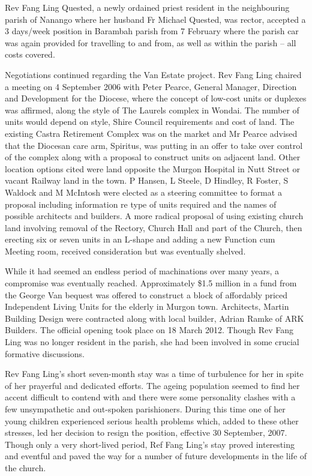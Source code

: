 Rev Fang Ling Quested, a newly ordained priest resident in the neighbouring parish of Nanango where her husband Fr Michael Quested, was rector, accepted a 3 days/week position in Barambah parish from 7 February where the parish car was again provided for travelling to and from, as well as within the parish -- all costs covered.



Negotiations continued regarding the Van Estate project. Rev Fang Ling chaired a meeting on 4 September 2006 with Peter Pearce, General Manager, Direction and Development for the Diocese, where the concept of low-cost units or duplexes was affirmed, along the style of The Laurels complex in Wondai. The number of units would depend on style, Shire Council requirements and cost of land. The existing Castra Retirement Complex was on the market and Mr Pearce advised that the Diocesan care arm, Spiritus, was putting in an offer to take over control of the complex along with a proposal to construct units on adjacent land. Other location options cited were land opposite the Murgon Hospital in Nutt Street or vacant Railway land in the town. P Hansen, L Steele, D Hindley, R Foster, S Waldock and M McIntosh were elected as a steering committee to format a proposal including information re type of units required and the names of possible architects and builders. A more radical proposal of using existing church land involving removal of the Rectory, Church Hall and part of the Church, then erecting six or seven units in an L-shape and adding a new Function cum Meeting room, received consideration but was eventually shelved.



While it had seemed an endless period of machinations over many years, a compromise was eventually reached. Approximately \$1.5 million in a fund from the George Van bequest was offered to construct a block of affordably priced Independent Living Units for the elderly in Murgon town. Architects, Martin Building Design were contracted along with local builder, Adrian Ramke of ARK Builders. The official opening took place on 18 March 2012. Though Rev Fang Ling was no longer resident in the parish, she had been involved in some crucial formative discussions.



Rev Fang Ling's short seven-month stay was a time of turbulence for her in spite of her prayerful and dedicated efforts. The ageing population seemed to find her accent difficult to contend with and there were some personality clashes with a few unsympathetic and out-spoken parishioners. During this time one of her young children experienced serious health problems which, added to these other stresses, led her decision to resign the position, effective 30 September, 2007. Though only a very short-lived period, Ref Fang Ling's stay proved interesting and eventful and paved the way for a number of future developments in the life of the church.



